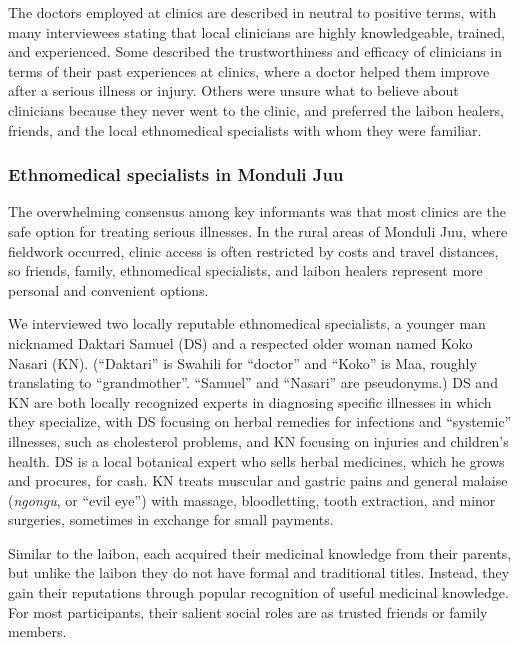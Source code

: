 \documentclass[
  11pt,
]{article}
\begin{document}
The doctors employed at clinics are described in neutral to positive terms, with many interviewees stating that local clinicians are highly knowledgeable, trained, and experienced. Some described the trustworthiness and efficacy of clinicians in terms of their past experiences at clinics, where a doctor helped them improve after a serious illness or injury. Others were unsure what to believe about clinicians because they never went to the clinic, and preferred the laibon healers, friends, and the local ethnomedical specialists with whom they were familiar.

\hypertarget{ethnomedical-specialists-in-monduli-juu}{%
\subsubsection{Ethnomedical specialists in Monduli Juu}\label{ethnomedical-specialists-in-monduli-juu}}

The overwhelming consensus among key informants was that most clinics are the safe option for treating serious illnesses. In the rural areas of Monduli Juu, where fieldwork occurred, clinic access is often restricted by costs and travel distances, so friends, family, ethnomedical specialists, and laibon healers represent more personal and convenient options.

We interviewed two locally reputable ethnomedical specialists, a younger man nicknamed Daktari Samuel (DS) and a respected older woman named Koko Nasari (KN). (``Daktari'' is Swahili for ``doctor'' and ``Koko'' is Maa, roughly translating to ``grandmother''. ``Samuel'' and ``Nasari'' are pseudonyms.) DS and KN are both locally recognized experts in diagnosing specific illnesses in which they specialize, with DS focusing on herbal remedies for infections and ``systemic'' illnesses, such as cholesterol problems, and KN focusing on injuries and children's health. DS is a local botanical expert who sells herbal medicines, which he grows and procures, for cash. KN treats muscular and gastric pains and general malaise (\emph{ngongu}, or ``evil eye'') with massage, bloodletting, tooth extraction, and minor surgeries, sometimes in exchange for small payments.

Similar to the laibon, each acquired their medicinal knowledge from their parents, but unlike the laibon they do not have formal and traditional titles. Instead, they gain their reputations through popular recognition of useful medicinal knowledge. For most participants, their salient social roles are as trusted friends or family members.
\end{document}
